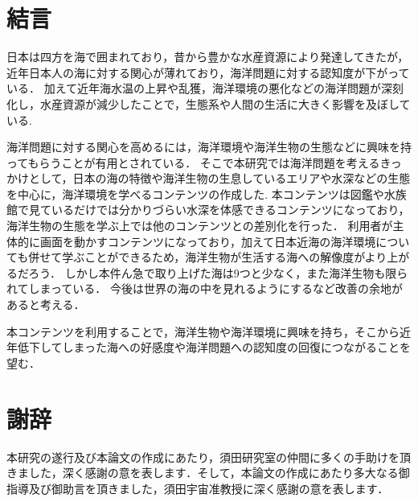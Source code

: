 \documentclass[12pt,a4j,titlepage]{ltjsarticle}
\begin{document}
\section{結言}\label{結言}
日本は四方を海で囲まれており，昔から豊かな水産資源により発達してきたが，近年日本人の海に対する関心が薄れており，海洋問題に対する認知度が下がっている．
加えて近年海水温の上昇や乱獲，海洋環境の悪化などの海洋問題が深刻化し，水産資源が減少したことで，生態系や人間の生活に大きく影響を及ぼしている.\par
海洋問題に対する関心を高めるには，海洋環境や海洋生物の生態などに興味を持ってもらうことが有用とされている．
そこで本研究では海洋問題を考えるきっかけとして，日本の海の特徴や海洋生物の生息しているエリアや水深などの生態を中心に，海洋環境を学べるコンテンツの作成した.
本コンテンツは図鑑や水族館で見ているだけでは分かりづらい水深を体感できるコンテンツになっており，海洋生物の生態を学ぶ上では他のコンテンツとの差別化を行った．
利用者が主体的に画面を動かすコンテンツになっており，加えて日本近海の海洋環境についても併せて学ぶことができるため，海洋生物が生活する海への解像度がより上がるだろう．
しかし本件ん急で取り上げた海は9つと少なく，また海洋生物も限られてしまっている．
今後は世界の海の中を見れるようにするなど改善の余地があると考える．\par
本コンテンツを利用することで，海洋生物や海洋環境に興味を持ち，そこから近年低下してしまった海への好感度や海洋問題への認知度の回復につながることを望む．
\clearpage

\section{謝辞}
本研究の遂行及び本論文の作成にあたり，須田研究室の仲間に多くの手助けを頂きました，深く感謝の意を表します．そして，本論文の作成にあたり多大なる御指導及び御助言を頂きました，須田宇宙准教授に深く感謝の意を表します．
\clearpage
\end{document}
